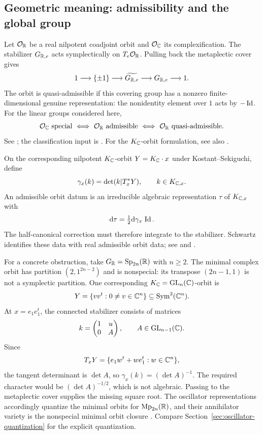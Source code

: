 \subsection{Geometric meaning: admissibility and the global group}

Let $\mathcal{O}_{\mathbb{R}}$ be a real nilpotent coadjoint orbit and $\mathcal{O}_{\mathbb{C}}$
its complexification. The stabilizer $G_{\mathbb{R},e}$ acts symplectically
on $T_e\mathcal{O}_{\mathbb{R}}$. Pulling back the metaplectic cover gives
\[
  1\longrightarrow\{\pm1\}
  \longrightarrow\widetilde{G_{\mathbb{R},e}}
  \longrightarrow G_{\mathbb{R},e}\longrightarrow1.
\]
The orbit is quasi-admissible if this covering group has a nonzero
finite-dimensional genuine representation: the nonidentity element
over $1$ acts by $-\operatorname{Id}$. For the linear groups considered here,
\begin{equation}\label{eq:special-annihilator-admissibility}
  \mathcal{O}_{\mathbb{C}}\text{ special}
  \ \Longleftrightarrow\
  \mathcal{O}_{\mathbb{R}}\text{ admissible}
  \ \Longleftrightarrow\
  \mathcal{O}_{\mathbb{R}}\text{ quasi-admissible}.
\end{equation}
See \cite[Defs.~2.21--2.22 and Prop.~1.2]{GGS21}; the classification
input is \cite[Thm.~3]{Ohta1991}. For the $K_{\mathbb{C}}$-orbit formulation,
see also \cite[Prop.~4.4.1]{Yu2026OrbitMethod}.

On the corresponding nilpotent $K_{\mathbb{C}}$-orbit
$Y=K_{\mathbb{C}}\cdot x$ under Kostant--Sekiguchi, define
\[
  \gamma_x(k)=\det(k|T_x^*Y),\qquad k\in K_{\mathbb{C},x}.
\]
An admissible orbit datum is an irreducible algebraic representation
$\tau$ of $K_{\mathbb{C},x}$ with
\[
  \mathrm{d}\tau=\tfrac12\mathrm{d}\gamma_x\,\operatorname{Id}.
\]
The half-canonical correction must therefore integrate to the
stabilizer. Schwartz identifies these data with real admissible
orbit data; see \cite[Def.~5.2 and Thm.~5.3]{Vogan2000OrbitMethod}
and \cite{Sch87}.

For a concrete obstruction, take $G_{\mathbb{R}}=\operatorname{Sp}_{2n}(\mathbb{R})$ with $n\geq2$.
The minimal complex orbit has partition $(2,1^{2n-2})$ and is
nonspecial: its transpose $(2n-1,1)$ is not a symplectic partition.
One corresponding $K_{\mathbb{C}}=\operatorname{GL}_n(\mathbb{C})$-orbit is
\[
  Y=\{vv^t:0\ne v\in\mathbb{C}^n\}\subseteq\operatorname{Sym}^2(\mathbb{C}^n).
\]
At $x=e_1e_1^t$, the connected stabilizer consists of matrices
\[
  k=\begin{pmatrix}1&u\\0&A\end{pmatrix},
  \qquad A\in\operatorname{GL}_{n-1}(\mathbb{C}).
\]
Since
\[
  T_xY=\{e_1w^t+we_1^t:w\in\mathbb{C}^n\},
\]
the tangent determinant is $\det A$, so
$\gamma_x(k)=(\det A)^{-1}$. The required character would be
$(\det A)^{-1/2}$, which is not algebraic. Passing to the metaplectic
cover supplies the missing square root. The oscillator representations
accordingly quantize the minimal orbits for
$\operatorname{Mp}_{2n}(\mathbb{R})$, and their annihilator variety is the
nonspecial minimal orbit closure
\cite[Examp.~4.3.7]{Yu2026OrbitMethod}. Compare
Section~\ref{sec:oscillator-quantization} for the explicit quantization.

